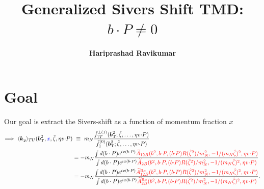 \documentclass[]{article}
\title{Generalized Sivers Shift TMD: $b\cdot P \neq 0$}
\author{\textbf{Hariprashad Ravikumar}}
\date{}
\numberwithin{equation}{section}
\newcommand{\tcdot}{{\cdot}}
\newcommand{\vect}[1]{\ensuremath{\boldsymbol{#1}}}
\newcommand{\vprp}[1]{\vect{#1}_{\mathrm T}}
\newcommand{\tAmp}{\widetilde{A}}
\newcommand{\tAmp}{\ensuremath{\widetilde{A}^{(+)}}}
\newcommand{\bvec}{b}
\newcommand{\mN}{m_N}
\newcommand{\zetahat}{{\hat \zeta}}
\begin{document}
	\maketitle
\tableofcontents
\section{Goal}
Our goal is extract the Sivers-shift as a function of momentum fraction $x$
\begin{align}
   \Longrightarrow~ \langle \vect{k}_y \rangle_{TU}(\vprp{\bvec}^2,\textcolor{blue}{x},\zetahat,\eta v \tcdot P) 
	&\ \equiv\ \mN \frac{\tilde f_{1T}^{\perp(1)}(\vprp{\bvec}^2;\zetahat,\ldots,\eta v \tcdot P)}{\tilde f_1^{(0)}(\vprp{\bvec}^2;\zetahat,\ldots,\eta v \tcdot P)}\\
 &=-m_{N} \frac{\int d(b\cdot P)e^{ix(b\cdot P)} \textcolor{red}{\tAmp_{12B}(\bvec^2,\bvec \tcdot P,(\bvec \tcdot P) R(\zetahat^2)/\mN^2,-1/(\mN\zetahat)^2,\eta v \tcdot P)}}{\int d(b\cdot P)e^{ix(b\cdot P)}\textcolor{red}{\tAmp_{2B}(\bvec^2,\bvec \tcdot P,(\bvec \tcdot P) R(\zetahat^2)/\mN^2,-1/(\mN\zetahat)^2,\eta v \tcdot P)}}\\
 &=-m_{N} \frac{\int d(b\cdot P)e^{ix(b\cdot P)} \textcolor{red}{\tAmp_{12B}^{\text{Re}}(\bvec^2,\bvec \tcdot P,(\bvec \tcdot P) R(\zetahat^2)/\mN^2,-1/(\mN\zetahat)^2,\eta v \tcdot P)}}{\int d(b\cdot P)e^{ix(b\cdot P)}\textcolor{red}{\tAmp_{2B}^{\text{Re}}(\bvec^2,\bvec \tcdot P,(\bvec \tcdot P) R(\zetahat^2)/\mN^2,-1/(\mN\zetahat)^2,\eta v \tcdot P)}}.
 \end{align}
\end{document}
